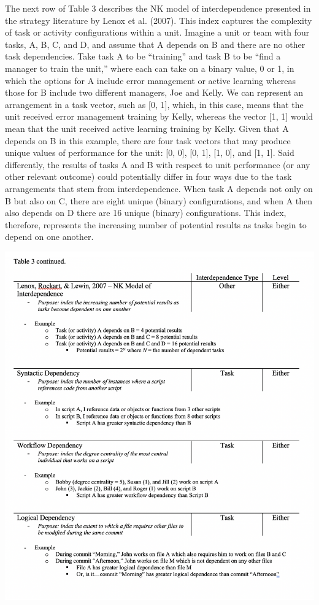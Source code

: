 \documentclass[english,,man]{apa6}
\theoremstyle{definition}
\theoremstyle{definition}
\theoremstyle{definition}
\theoremstyle{remark}
\begin{document}
The next row of Table 3 describes the NK model of interdependence
presented in the strategy literature by Lenox et al. (2007). This index
captures the complexity of task or activity configurations within a
unit. Imagine a unit or team with four tasks, A, B, C, and D, and assume
that A depends on B and there are no other task dependencies. Take task
A to be \enquote{training} and task B to be \enquote{find a manager to
train the unit,} where each can take on a binary value, 0 or 1, in which
the options for A include error management or active learning whereas
those for B include two different managers, Joe and Kelly. We can
represent an arrangement in a task vector, such as {[}0, 1{]}, which, in
this case, means that the unit received error management training by
Kelly, whereas the vector {[}1, 1{]} would mean that the unit received
active learning training by Kelly. Given that A depends on B in this
example, there are four task vectors that may produce unique values of
performance for the unit: {[}0, 0{]}, {[}0, 1{]}, {[}1, 0{]}, and {[}1,
1{]}. Said differently, the results of tasks A and B with respect to
unit performance (or any other relevant outcome) could potentially
differ in four ways due to the task arrangements that stem from
interdependence. When task A depends not only on B but also on C, there
are eight unique (binary) configurations, and when A then also depends
on D there are 16 unique (binary) configurations. This index, therefore,
represents the increasing number of potential results as tasks begin to
depend on one another.

\includegraphics{images/table3b.png}
\end{document}
